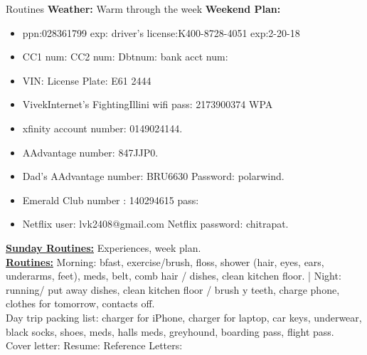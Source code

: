 \documentclass[serif, mathserif, final]{beamer}
\begin{document}
\begin{frame}
  \begin{columns}
    \begin{column}{0.25\linewidth} %
      \begin{block}{Routines}
        {{\tiny \bf Weather:} Warm through the week} 
        {\tiny \bf Weekend Plan:}
        \begin{itemize}
        \item \tiny ppn:028361799  exp: driver's license:K400-8728-4051  exp:2-20-18 
        \item \tiny CC1 num: CC2 num: Dbtnum:  bank acct num:  
        \item \tiny VIN:        License Plate:  E61 2444 
        \item \tiny VivekInternet’s FightingIllini  wifi pass: 2173900374 WPA 
        \item \tiny xfinity account number: 0149024144. 
        \item \tiny AAdvantage number: 847JJP0.
        \item \tiny Dad's AAdvantage number: BRU6630 Password: polarwind.
        \item \tiny Emerald Club number :  140294615   pass: 
        \item \tiny Netflix user:  lvk2408@gmail.com  Netflix password: chitrapat. 
        \end{itemize}
      \end{block}
      
      \textbf{\underline{Sunday Routines:}} Experiences, week plan. \\ 
      \textbf{\underline{Routines:}} Morning: bfast, exercise/brush,
      floss, shower (hair, eyes, ears, underarms, feet), meds, belt,
      comb hair / dishes, clean kitchen floor. |  Night: running/ put away dishes, clean kitchen floor / brush
y      teeth, charge phone, clothes for tomorrow, contacts off. \\
      
      Day trip packing list: charger for iPhone, charger for laptop, car
      keys, underwear, black socks, shoes, meds, halls meds, greyhound,
      boarding pass, flight pass. \\ 
      
      Cover letter: 
      Resume: 
      Reference Letters: \\ 
      

\end{column}
\end{columns}
\end{frame}
\end{document}
